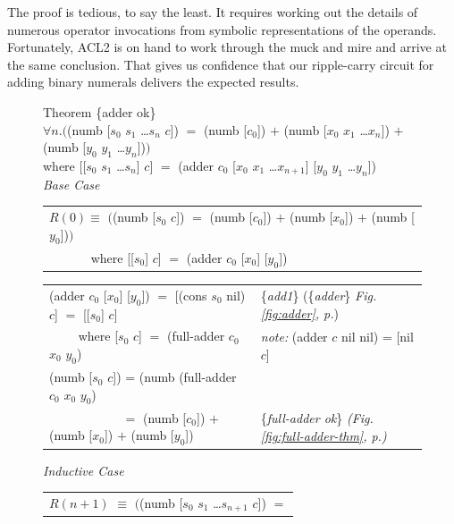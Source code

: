 The proof is tedious, to say the least.
It requires working out the details of
numerous operator invocations
from symbolic representations of the operands.
Fortunately, ACL2 is on hand to work through the
muck and mire and arrive at the same conclusion.
That gives us confidence that our ripple-carry circuit
for adding binary numerals delivers the expected results.

\begin{figure}
Theorem \{adder ok\}\\
$\forall n.($\textsf{(numb [$s_0$ $s_1$ \dots $s_{n}$ $c$])} $=$
\textsf{(numb [$c_0$])} $+$ \textsf{(numb [$x_0$ $x_1$ \dots $x_{n}$])} $+$ \textsf{(numb [$y_0$ $y_1$ \dots $y_{n}$])}$)$\\
\hphantom{(numb}where \textsf{[[$s_0$ $s_1$ \dots $s_{n}$] $c$]} $=$ \textsf{(adder $c_0$ [$x_0$ $x_1$ \dots $x_{n+1}$] [$y_0$ $y_1$ \dots $y_{n}$])}\\
\emph{Base Case}
\begin{center}
\begin{tabular}{l}
\hline
$R(0) \equiv$  $($\textsf{(numb [$s_0$ $c$])} $=$ \textsf{(numb [$c_0$])} $+$ \textsf{(numb [$x_0$])} $+$ \textsf{(numb [$y_0$])}$)$ \\
 ~~~~~~ where \textsf{[[$s_0$] $c$]} $=$ \textsf{(adder $c_0$ [$x_0$] [$y_0$])} \\
\hline
\end{tabular}
\begin{tabular}{ll}
\textsf{(adder $c_0$ [$x_0$] [$y_0$])} $=$ \textsf{[(cons $s_0$ nil) $c$]} $=$ \textsf{[[$s_0$] $c$]} & \{\emph{add1}\} (\{\emph{adder}\} \emph{Fig. \ref{fig:adder}, p.\pageref{fig:adder}}) \\
~~~~ where \textsf{[$s_0$ $c$]} $=$ \textsf{(full-adder $c_0$ $x_0$ $y_0$)}          & \emph{note:} (adder $c$ nil nil) = [nil $c$] \\
\textsf{(numb [$s_0$ $c$])} = \textsf{(numb (full-adder $c_0$ $x_0$ $y_0$)}          &  \\
~~~~~~~~~~~ $=$ \textsf{(numb [$c_0$])} $+$ \textsf{(numb [$x_0$])} $+$ \textsf{(numb [$y_0$])}  & \{\emph{full-adder ok}\} \emph{(Fig. \ref{fig:full-adder-thm}, p.\pageref{fig:full-adder-thm})}\\
\end{tabular}
\end{center}
\emph{Inductive Case}
\begin{center}
\begin{tabular}{l}
 \hline
$R(n+1)$ $\equiv$ $($\textsf{(numb [$s_0$ $s_1$ \dots $s_{n+1}$ $c$])} $=$ \\

\end{tabular}
\end{center}
\end{figure}

